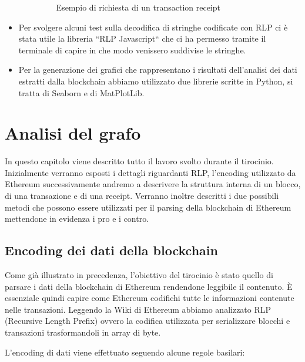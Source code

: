 \documentclass[12pt]{report}
\begin{document}
\begin{itemize}
\begin{itemize}
\begin{figure}[H]
                \caption{Esempio di richiesta di un transaction receipt}
            \end{figure}
        \end{itemize}
    \item Per svolgere alcuni test sulla decodifica di stringhe codificate con RLP ci è stata utile la libreria ``RLP Javascript`` \cite{RLPGitHub} che ci ha permesso tramite il terminale di capire in che modo venissero suddivise le stringhe.
    \item Per la generazione dei grafici che rappresentano i risultati dell'analisi dei dati estratti dalla blockchain abbiamo utilizzato due librerie scritte in Python, si tratta di Seaborn\cite{Seaborn} e di MatPlotLib\cite{MatPlotLib}.
\end{itemize}


\chapter{Analisi del grafo}

In questo capitolo viene descritto tutto il lavoro svolto durante il tirocinio. Inizialmente verranno esposti i dettagli riguardanti RLP, l'encoding utilizzato da Ethereum successivamente andremo a descrivere la struttura interna di un blocco, di una transazione e di una receipt.
Verranno inoltre descritti i due possibili metodi che possono essere utilizzati per il parsing della blockchain di Ethereum mettendone in evidenza i pro e i contro.

\section{Encoding dei dati della blockchain}

Come già illustrato in precedenza, l'obiettivo del tirocinio è stato quello di parsare i dati della blockchain di Ethereum rendendone leggibile il contenuto.
È essenziale quindi capire come Ethereum codifichi tutte le informazioni contenute nelle transazioni.
Leggendo la Wiki di Ethereum \cite{RLP} abbiamo  analizzato RLP (Recursive Length Prefix) ovvero la codifica utilizzata per serializzare blocchi e transazioni trasformandoli in array di byte.

L'encoding di dati viene effettuato seguendo alcune regole basilari:
\end{document}
